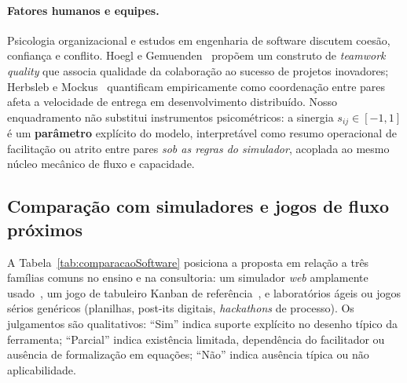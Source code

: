 \paragraph{Fatores humanos e equipes.}
Psicologia organizacional e estudos em engenharia de software discutem coesão, confiança e conflito. Hoegl e Gemuenden~\cite{hoegl2001teamwork} propõem um construto de \emph{teamwork quality} que associa qualidade da colaboração ao sucesso de projetos inovadores; Herbsleb e Mockus~\cite{herbsleb2003empirical} quantificam empiricamente como coordenação entre pares afeta a velocidade de entrega em desenvolvimento distribuído. Nosso enquadramento não substitui instrumentos psicométricos: a sinergia $s_{ij}\in[-1,1]$ é um \textbf{parâmetro} explícito do modelo, interpretável como resumo operacional de facilitação ou atrito entre pares \emph{sob as regras do simulador}, acoplada ao mesmo núcleo mecânico de fluxo e capacidade.

\subsection{Comparação com simuladores e jogos de fluxo próximos}
A Tabela~\ref{tab:comparacaoSoftware} posiciona a proposta em relação a três famílias comuns no ensino e na consultoria: um simulador \emph{web} amplamente usado~\cite{kanbanSimulator}, um jogo de tabuleiro Kanban de referência~\cite{getkanban}, e laboratórios ágeis ou jogos sérios genéricos (planilhas, post-its digitais, \emph{hackathons} de processo). Os julgamentos são qualitativos: ``Sim'' indica suporte explícito no desenho típico da ferramenta; ``Parcial'' indica existência limitada, dependência do facilitador ou ausência de formalização em equações; ``Não'' indica ausência típica ou não aplicabilidade.

